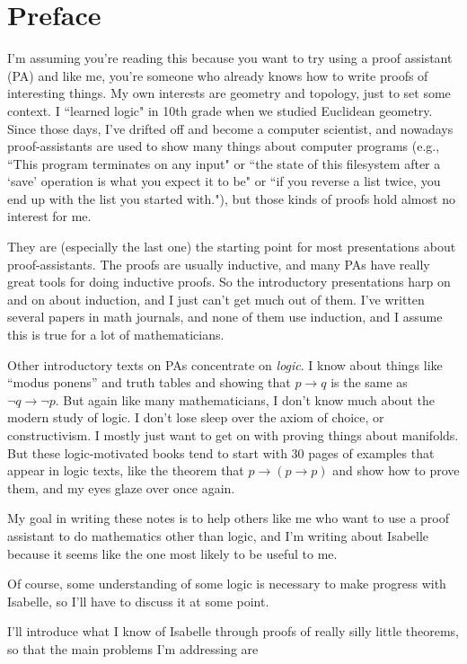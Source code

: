 \chapter* {Preface}

I'm assuming you're reading this because you want to try using a proof assistant (PA) and like me, you're someone who already knows how to write proofs of interesting things. My own interests are geometry and topology, just to set some context. I ``learned logic" in 10th grade when we studied Euclidean geometry. Since those days, I've drifted off and become a computer scientist, and nowadays proof-assistants are used to show many things about computer programs (e.g., ``This program terminates on any input" or ``the state of this filesystem after a `save' operation is what you expect it to be" or ``if you reverse a list twice, you end up with the list you started with."), but those kinds of proofs hold almost no interest for me.

They are (especially the last one) the starting point for most presentations about proof-assistants. The proofs are usually inductive, and many PAs have really great tools for doing inductive proofs. So the introductory presentations harp on and on about induction, and I just can't get much out of them. I've written several papers in math journals, and none of them use induction, and I assume this is true for a lot of mathematicians. 

Other introductory texts on PAs concentrate on \textit{logic}. I know about things like ``modus ponens'' and truth tables and showing that $p \to q$ is the same as $\neg q \to \neg p$. But again like many mathematicians, I don't know much about the modern study of logic. I don't lose sleep over the axiom of choice, or constructivism. I mostly just want to get on with proving things about manifolds. But these logic-motivated books tend to start with 30 pages of examples that appear in logic texts, like the theorem that $p \to  (p \to p)$ and show how to prove them, and my eyes glaze over once again. 

My goal in writing these notes is to help others like me who want to use a proof assistant to do mathematics other than logic, and I'm writing about Isabelle because it seems like the one most likely to be useful to me. 

Of course, some understanding of some logic is necessary to make progress with Isabelle, so I'll have to discuss it at some point. 

I'll introduce what I know of Isabelle through proofs of really silly little theorems, so that the main problems I'm addressing are 

